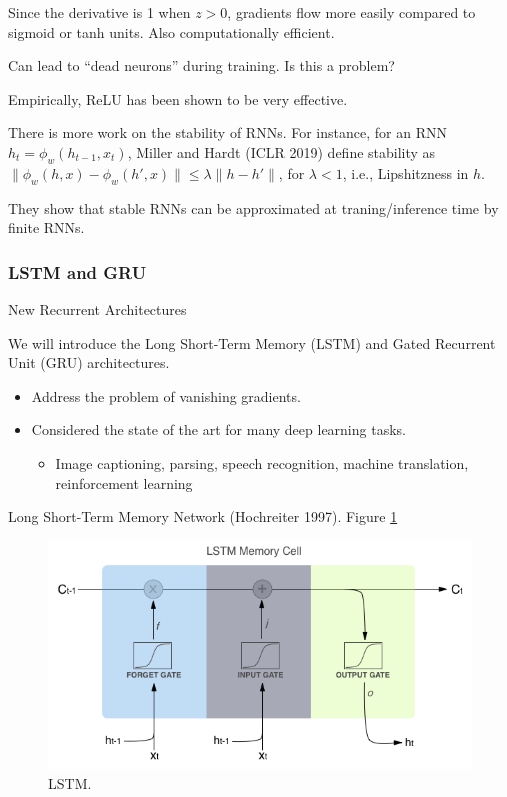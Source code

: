 \documentclass[english]{article}
\begin{document}
Since the derivative is 1 when $z>0$, gradients flow more easily compared to sigmoid or tanh units. Also computationally efficient.  

Can lead to ``dead neurons'' during training. Is this a problem? 

Empirically, ReLU has been shown to be very effective.


\item There is more work on the stability of RNNs. For instance, for an RNN $h_t = \phi_w(h_{t-1},x_t)$, Miller and Hardt (ICLR 2019) define stability as $\|\phi_w(h,x)-\phi_w(h',x)\|\le \lambda \|h-h'\|$, for $\lambda<1$, i.e., Lipshitzness in $h$. 

They show that stable RNNs can be approximated at traning/inference time by finite RNNs.

 \eenum

\subsubsection{LSTM and GRU}
\benum
\item 
 {New Recurrent Architectures}

We will introduce the Long Short-Term Memory (LSTM) and Gated Recurrent Unit (GRU) architectures. 
\begin{itemize}
\item Address the problem of vanishing gradients.
\item Considered the state of the art for many deep learning tasks.
\begin{itemize}
\item Image captioning, parsing, speech recognition, machine translation, reinforcement learning
\end{itemize}
\end{itemize}
 

\item 
 {Long Short-Term Memory Network (Hochreiter 1997)}.  Figure \ref{LSTM}

\begin{figure}
\centering
\includegraphics[height=0.33\linewidth]{lstm-cell.png}
    \caption{LSTM.}
    \label{LSTM}
\end{figure}
\end{document}
